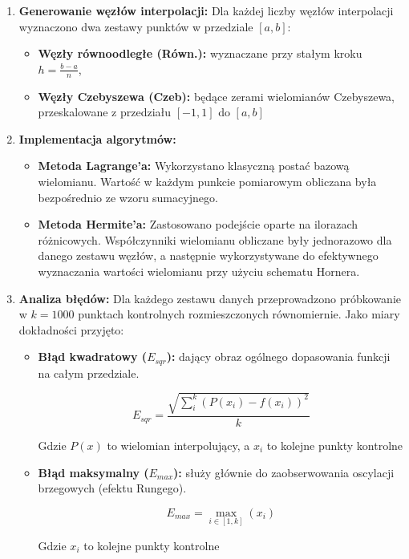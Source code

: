 \documentclass{article}
\begin{document}
\begin{enumerate}
    \item \textbf{Generowanie węzłów interpolacji:} Dla każdej liczby węzłów interpolacji wyznaczono dwa zestawy punktów w przedziale $[a, b]$:
    \begin{itemize}
        \item \textbf{Węzły równoodległe (Równ.):} wyznaczane przy stałym kroku $h = \frac{b-a}{n}$,
        \item \textbf{Węzły Czebyszewa (Czeb):} będące zerami wielomianów Czebyszewa, przeskalowane z przedziału $[-1, 1]$ do $[a, b]$
    \end{itemize}
    
    \item \textbf{Implementacja algorytmów:}
    \begin{itemize}
        \item \textbf{Metoda Lagrange'a:} Wykorzystano klasyczną postać bazową wielomianu. Wartość w każdym punkcie pomiarowym obliczana była bezpośrednio ze wzoru sumacyjnego.
        \item \textbf{Metoda Hermite'a:} Zastosowano podejście oparte na ilorazach różnicowych. Współczynniki wielomianu obliczane były jednorazowo dla danego zestawu węzłów, a następnie wykorzystywane do efektywnego wyznaczania wartości wielomianu przy użyciu schematu Hornera.
    \end{itemize}

    \item \textbf{Analiza błędów:} Dla każdego zestawu danych przeprowadzono próbkowanie w $k=1000$ punktach kontrolnych rozmieszczonych równomiernie. Jako miary dokładności przyjęto:
    \begin{itemize}
        \item \textbf{Błąd kwadratowy ($E_{sqr}$):} dający obraz ogólnego dopasowania funkcji na całym przedziale.
        
        \begin{center}
        \begin{Large}
            \[E_{sqr} = \frac{\sqrt{\sum_{i}^{k}(P(x_{i}) - f(x_{i}))^{2}}}{k}\]
        \end{Large}
        \end{center}  
        
        
        Gdzie $P(x)$ to wielomian interpolujący, a $x_{i}$ to kolejne punkty kontrolne 
        \item \textbf{Błąd maksymalny ($E_{max}$):} służy głównie do zaobserwowania oscylacji brzegowych (efektu Rungego).
        
        \begin{center}
        \begin{Large}
            \[E_{max}=\max_{i\in[1,k]}(x_{i})\]
        \end{Large}
        \end{center}
        
        Gdzie $x_{i}$ to kolejne punkty kontrolne
    \end{itemize}
\end{enumerate}
\end{document}

